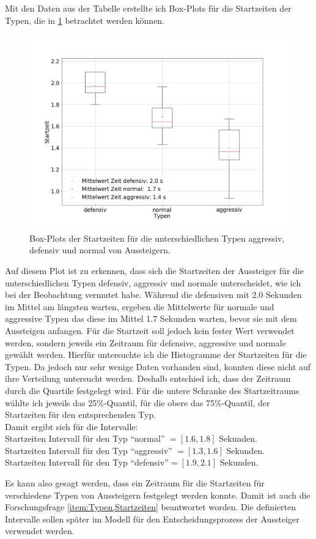 Mit den Daten aus der Tabelle erstellte ich Box-Plots für die Startzeiten der Typen, die in \figurename \ref{fig:BoxPlotStartingTime} betrachtet werden können.
\begin{figure}[H]
	\centering
		\includegraphics[width=1.0\textwidth]{pictures/data_evaluation/types/starting_time/starting_times.png}
	\caption{Box-Plots der Startzeiten für die unterschiedlichen Typen aggressiv, defensiv und normal von Aussteigern.}
	\label{fig:BoxPlotStartingTime}
\end{figure}
Auf diesem Plot ist zu erkennen, dass sich die Startzeiten der Aussteiger für die unterschiedlichen Typen defensiv, aggressiv und normale unterscheidet, wie ich bei der Beobachtung vermutet habe. Während die defensiven mit 2.0 Sekunden im Mittel am längsten warten, ergeben die Mittelwerte für normale und aggressive Typen das diese im Mittel 1.7  Sekunden warten, bevor sie mit dem Aussteigen anfangen. Für die Startzeit soll jedoch kein fester Wert verwendet werden, sondern jeweils ein Zeitraum für defensive, aggressive und normale gewählt werden. Hierfür untersuchte ich die Histogramme der Startzeiten für die Typen. Da jedoch nur sehr wenige Daten vorhanden sind, konnten diese nicht auf ihre Verteilung untersucht werden. Deshalb entschied ich, dass der Zeitraum durch die Quartile festgelegt wird. Für die untere Schranke des Startzeitraums wählte ich jeweils das 25\%-Quantil, für die obere das 75\%-Quantil, der Startzeiten für den entsprechenden Typ. \\ 
Damit ergibt sich für die Intervalle: \\
Startzeiten Intervall für den Typ "`normal"' $= [1.6, 1.8]$ Sekunden. \\
Startzeiten Intervall für den Typ "`aggressiv"' $= [1.3, 1.6]$ Sekunden. \\
Startzeiten Intervall für den Typ "`defensiv"'$= [1.9, 2.1]$ Sekunden. 

Es kann also gesagt werden, dass ein Zeitraum für die Startzeiten für verschiedene Typen von Aussteigern festgelegt werden konnte. Damit ist auch die Forschungsfrage \ref{item:Typen,Startzeiten} beantwortet worden. Die definierten Intervalle sollen später im Modell für den Entscheidungsprozess der Aussteiger verwendet werden.
